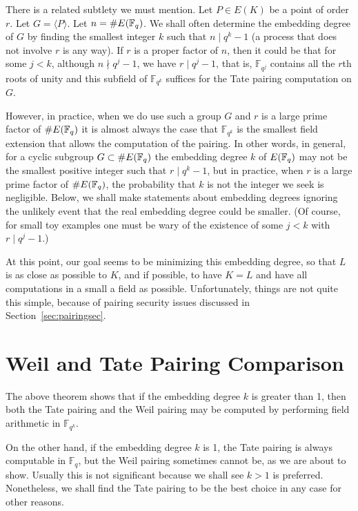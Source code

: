 There is a related subtlety we must mention.
Let $P \in E(K)$ be a point of order $r$.
Let $G = \langle P \rangle$.
Let $n = \#E(\mathbb{F}_q)$.
We shall often determine the embedding degree of $G$
by finding the smallest integer $k$ such that $n \mid q^k - 1$
(a process that does not involve $r$ is any way).
If $r$ is a proper factor of $n$,
then it could be that for some $j < k$, although $n \nmid q^j - 1$,
we have $r \mid q^j - 1$, that is,
$\mathbb{F}_{q^j}$ contains all the $r$th roots of unity and this
subfield of $\mathbb{F}_{q^k}$ suffices for
the Tate pairing computation on $G$.

However, in practice, when we do use such a group $G$ and
$r$ is a large prime factor of $\#E(\mathbb{F}_q)$ it is almost always the case that
$\mathbb{F}_{q^k}$ is the smallest field extension that allows the computation
of the pairing.
In other words, in general, for a cyclic subgroup $G \subset \#E(\mathbb{F}_q)$
the embedding degree $k$ of $E(\mathbb{F}_q)$
may not be the smallest positive integer such that $r \mid q^k - 1$,
but in practice, when $r$ is a large prime factor of $\#E(\mathbb{F}_q)$,
the probability that $k$ is not the integer we seek is negligible.
Below, we shall make statements
about embedding degrees ignoring the unlikely event that the
real embedding degree could be smaller.
(Of course, for small toy examples one must be wary of the existence of
some $j < k$ with $r \mid q^j - 1$.)

At this point, our goal seems to be minimizing this embedding degree,
so that $L$ is as close as possible to $K$, and if possible,
to have $K = L$ and have all computations in a
small a field as possible.
Unfortunately, things are not quite this simple, because of
pairing security issues discussed in
Section~\ref{sec:pairingsec}.

\section {Weil and Tate Pairing Comparison}

The above theorem shows that if the embedding degree $k$ is greater than 1,
then both the Tate pairing and the Weil pairing may be computed by
performing field arithmetic in $\mathbb{F}_{q^k}$.

On the other hand, if the embedding degree $k$ is 1, the Tate pairing is always
computable in $\mathbb{F}_q$, but the Weil pairing sometimes cannot be,
as we are about to show.
Usually this is not significant because we shall see
$k > 1$ is preferred.
Nonetheless, we shall find the Tate pairing to be the best choice in
any case for other reasons.

